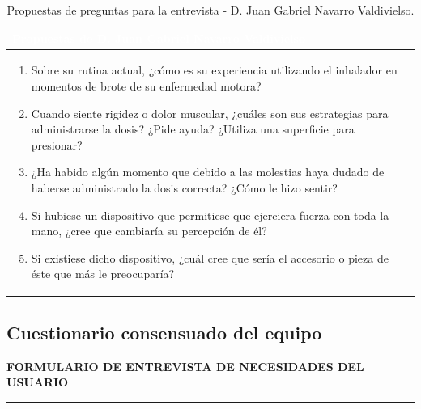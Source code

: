 \documentclass[11pt,a4paper]{article}
\begin{document}
\begin{table}[H]
    \centering
    \small
    \renewcommand{\arraystretch}{1.5}
    \begin{tabularx}{\linewidth}{|X|}
        \hline
        \rowcolor{ArthroNavy}
        \textcolor{white}{\textbf{Propuestas de D. Juan Gabriel Navarro Valdivielso}} \\ \hline
        \vspace{0.1cm}
        \begin{enumerate}[leftmargin=0.8cm, itemsep=0.2cm]
            \item Sobre su rutina actual, ¿cómo es su experiencia utilizando el inhalador en momentos de brote de su enfermedad motora? 
            \item Cuando siente rigidez o dolor muscular, ¿cuáles son sus estrategias para administrarse la dosis? ¿Pide ayuda? ¿Utiliza una superficie para presionar?
            \item ¿Ha habido algún momento que debido a las molestias haya dudado de haberse administrado la dosis correcta? ¿Cómo le hizo sentir? 
            \item Si hubiese un dispositivo que permitiese que ejerciera fuerza con toda la mano, ¿cree que cambiaría su percepción de él? 
            \item Si existiese dicho dispositivo, ¿cuál cree que sería el accesorio o pieza de éste que más le preocuparía? 
        \end{enumerate}
        \vspace{0.1cm} \\ \hline
    \end{tabularx}
    \caption{Propuestas de preguntas para la entrevista - D. Juan Gabriel Navarro Valdivielso.}
    \label{tab:preguntas_juan}
\end{table}
\newpage

\subsection{Cuestionario consensuado del equipo}


\vspace{0.8cm}


\begin{center}
    \Large\textbf{\color{ArthroNavy}FORMULARIO DE ENTREVISTA DE NECESIDADES DEL USUARIO} \\
    \vspace{0.2cm}
    \rule{\linewidth}{1.5pt}
\end{center}
\vspace{0.2cm}
\end{document}
